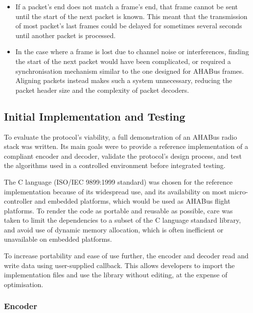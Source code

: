 \begin{itemize}
\item If a packet's end does not match a frame's end, that frame cannot be
sent until the start of the next packet is known. This meant that the
transmission of most packet's last frames could be delayed for sometimes several
seconds until another packet is processed.

\item In the case where a frame is lost due to channel noise or interferences,
finding the start of the next packet would have been complicated, or required
a synchronisation mechanism similar to the one designed for AHABus frames.
Aligning packets instead makes such a system unnecessary, reducing the packet
header size and the complexity of packet decoders.
\end{itemize}


\subsection{Initial Implementation and Testing}

To evaluate the protocol's viability, a full demonstration of an AHABus radio
stack was written. Its main goals were to provide a reference implementation of
a compliant encoder and decoder, validate the protocol's design process, and
test the algorithms used in a controlled environment before integrated testing.

The C language (ISO/IEC 9899:1999 standard) was chosen for the reference
implementation because of its widespread use, and its availability on most
micro-controller and embedded platforms, which would be used as AHABus flight
platforms. To render the code as portable and reusable as possible, care was
taken to limit the dependencies to a subset of the C language standard library,
and avoid use of dynamic memory allocation, which is often inefficient or
unavailable on embedded platforms.

To increase portability and ease of use further, the encoder and decoder read
and write data using user-supplied callback. This allows developers to import
the implementation files and use the library without editing, at the expense of
optimisation.

\subsubsection{Encoder}

